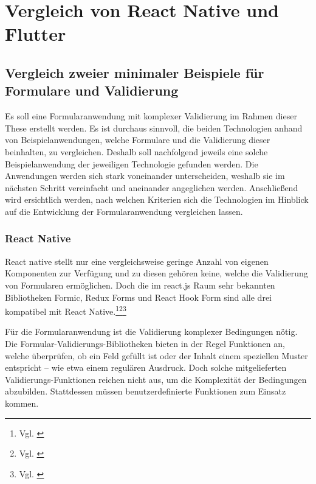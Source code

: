 
\section{Vergleich von React Native und Flutter}
\label{sec:Vergleich-React-Native-und-Flutter}

\subsection{Vergleich zweier minimaler Beispiele für Formulare und Validierung} 


Es soll eine Formularanwendung mit komplexer Validierung im Rahmen dieser These erstellt werden.
Es ist durchaus sinnvoll, die beiden Technologien anhand von  Beispielanwendungen, welche Formulare und die Validierung dieser  beinhalten,   zu vergleichen.  Deshalb soll nachfolgend  jeweils eine solche Beispielanwendung der jeweiligen Technologie gefunden werden. Die Anwendungen werden sich stark voneinander unterscheiden, weshalb sie im nächsten Schritt vereinfacht und aneinander angeglichen werden.  Anschließend wird ersichtlich werden, nach welchen Kriterien sich die Technologien im Hinblick auf die Entwicklung der Formularanwendung vergleichen lassen.

\subsubsection{React Native}

React native stellt nur eine vergleichsweise geringe Anzahl von eigenen Komponenten zur Verfügung und zu diesen gehören keine, welche die Validierung von Formularen ermöglichen.
Doch die im react.js Raum sehr bekannten Bibliotheken Formic, Redux Forms und React Hook Form sind alle drei kompatibel mit React Native.\footnote{Vgl. \cite{ReactNativeFormikDocs}}\footnote{Vgl. \cite{DoesReduxFormWorkWithReactNative}}\footnote{Vgl. \cite{ReactNativeReactHookFormGetStarted}}




Für die Formularanwendung ist die Validierung komplexer Bedingungen nötig.
Die Formular-Validierungs-Bibliotheken bieten in der Regel Funktionen an, welche überprüfen, ob ein Feld gefüllt ist oder der Inhalt einem speziellen Muster entspricht – wie etwa einem regulären Ausdruck.
Doch solche mitgelieferten Validierungs-Funktionen reichen nicht aus, um die Komplexität der Bedingungen abzubilden.
Stattdessen müssen benutzerdefinierte Funktionen zum Einsatz kommen.

